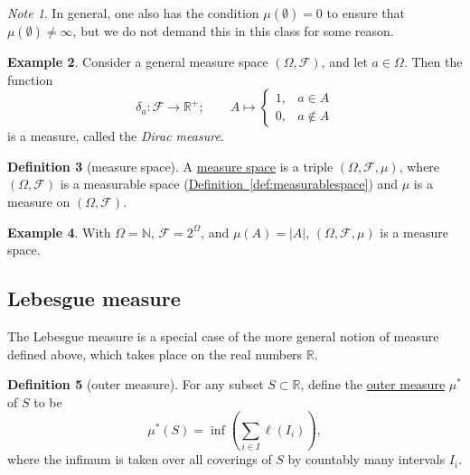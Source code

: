 \documentclass[a4paper,12pt]{scrreprt}
\newcommand{\R}{\mathbb{R}}
\newcommand{\N}{\mathbb{N}}
\newcommand{\defn}[1]{\ul{#1}}
\newcommand{\abs}[1]{\left|#1\right|}
\theoremstyle{definition}
\newtheorem{definition}{Definition}
\newtheorem{example}[definition]{Example}
\theoremstyle{plain}
\theoremstyle{remark}
\newtheorem{note}[definition]{Note}
\begin{document}
\begin{note}
  In general, one also has the condition $\mu(\emptyset) = 0$ to ensure that $\mu( \emptyset ) \neq \infty$, but we do not demand this in this class for some reason.
\end{note}

\begin{example}
  \label{eg:diracmeasure}
  Consider a general measure space $(\Omega, \mathcal{F})$, and let $a \in \Omega$. Then the function
  \begin{equation*}
    \delta_{a}\colon \mathcal{F} \to \R^{+};\qquad A \mapsto
    \begin{cases}
      1, &a \in A \\
      0, &a \notin A
    \end{cases}
  \end{equation*}
  is a measure, called the \emph{Dirac measure}.
\end{example}

\begin{definition}[measure space]
  \label{def:measurespace}
  A \defn{measure space} is a triple $(\Omega, \mathcal{F}, \mu)$, where $(\Omega, \mathcal{F})$ is a measurable space (\hyperref[def:measurablespace]{Definition~\ref*{def:measurablespace}}) and $\mu$ is a measure on $(\Omega, \mathcal{F})$.
\end{definition}

\begin{example}
  \label{eg:discretemeasurespace}
  With $\Omega = \N$, $\mathcal{F} = 2^{\Omega}$, and $\mu(A) = \abs{A}$, $(\Omega, \mathcal{F}, \mu)$ is a measure space.
\end{example}

\subsection{Lebesgue measure}
The Lebesgue measure is a special case of the more general notion of measure defined above, which takes place on the real numbers $\R$.
\begin{definition}[outer measure]
  \label{def:outermeasure}
  For any subset $S \subset \R$, define the \defn{outer measure} $\mu^{*}$ of $S$ to be
  \begin{equation*}
    \mu^{*}(S) = \inf\left( \sum_{i \in I}\ell(I_{i}) \right),
  \end{equation*}
  where the infimum is taken over all coverings of $S$ by countably many intervals $I_{i}$.
\end{definition}
\end{document}
